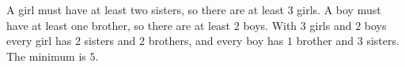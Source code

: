 A girl must have at least two sisters, so there are at least $3$ girls. A boy must have at least one brother, so there are at least $2$ boys. With $3$ girls and $2$ boys every girl has $2$ sisters and $2$ brothers, and every boy has $1$ brother and $3$ sisters. The minimum is $\boxed{5}$.
